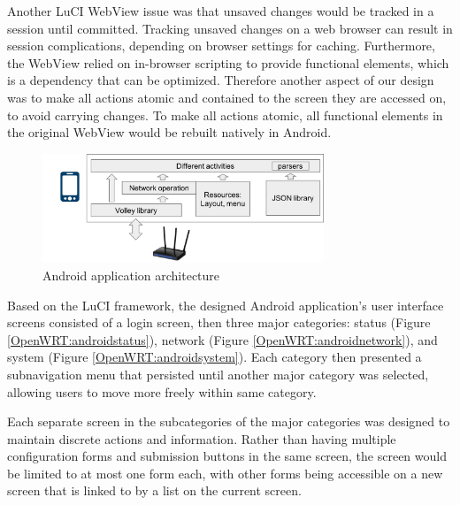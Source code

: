 Another LuCI WebView issue was that unsaved changes would be tracked in a session until committed. Tracking unsaved changes on a web browser can result in session complications, depending on browser settings for caching. Furthermore, the WebView relied on in-browser scripting to provide functional elements, which is a dependency that can be optimized. Therefore another aspect of our design was to make all actions atomic and contained to the screen they are accessed on, to avoid carrying changes. To make all actions atomic, all functional elements in the original WebView would be rebuilt natively in Android.
	
\begin{figure}
	\centering
	\includegraphics[width=0.75\textwidth]{android-architecture.png}
	\caption{Android application architecture}
	\label{android-architecture}
\end{figure}

Based on the LuCI framework, the designed Android application's user interface screens consisted of a login screen, then three major categories: status (Figure \ref{OpenWRT:androidstatus}), network (Figure \ref{OpenWRT:androidnetwork}), and system (Figure \ref{OpenWRT:androidsystem}). Each category then presented a subnavigation menu that persisted until another major category was selected, allowing users to move more freely within same category.

Each separate screen in the subcategories of the major categories was designed to maintain discrete actions and information. Rather than having multiple configuration forms and submission buttons in the same screen, the screen would be limited to at most one form each, with other forms being accessible on a new screen that is linked to by a list on the current screen.

